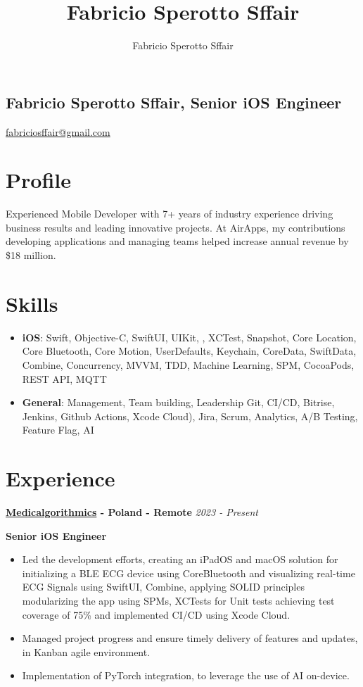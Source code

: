 \documentclass[11pt, oneside]{article}
\title{Fabricio Sperotto Sffair}
\author{Fabricio Sperotto Sffair}
\begin{document}
\begin{center}
    \section*{Fabricio Sperotto Sffair, Senior iOS Engineer}
    
    \href{https://www.linkedin.com/in/fabriciosffair/}{\faLinkedin \quad} \href{https://github.com/fabriciosffair}{\faGithub \quad}
    \href{mailto:fabriciosffair@gmail.com}{fabriciosffair@gmail.com}
\end{center}

\section*{Profile}

Experienced Mobile Developer with 7+ years of industry experience driving business results and leading innovative projects. At AirApps, my contributions developing applications and managing teams helped increase annual revenue by \$18 million.

\section*{Skills}

\begin{itemize}
    \item \textbf{iOS}: Swift, Objective-C, SwiftUI, UIKit, , XCTest, Snapshot, Core Location, Core Bluetooth, Core Motion, UserDefaults, Keychain, CoreData, SwiftData, Combine, Concurrency, MVVM, TDD, Machine Learning, SPM, CocoaPods, REST API, MQTT
    \item \textbf{General}:  Management, Team building, Leadership Git, CI/CD, Bitrise, Jenkins, Github Actions, Xcode Cloud), Jira, Scrum, Analytics, A/B Testing, Feature Flag, AI
\end{itemize}

\section*{Experience}

\textbf{\href{https://www.medicalgorithmics.com}{Medicalgorithmics} - Poland - Remote}
\hfill
\textit{2023 - Present}

\textbf{Senior iOS Engineer}

\begin{itemize}
    \item Led the development efforts, creating an iPadOS and macOS solution for initializing a BLE ECG device using CoreBluetooth and visualizing real-time ECG Signals using SwiftUI, Combine, applying SOLID principles modularizing the app using SPMs, XCTests for Unit tests achieving test coverage of 75\%  and implemented CI/CD using Xcode Cloud.
    \item Managed project progress and ensure timely delivery of features and updates, in Kanban agile environment.
    \item Implementation of PyTorch integration, to leverage the use of AI on-device.
\end{itemize}
\end{document}
